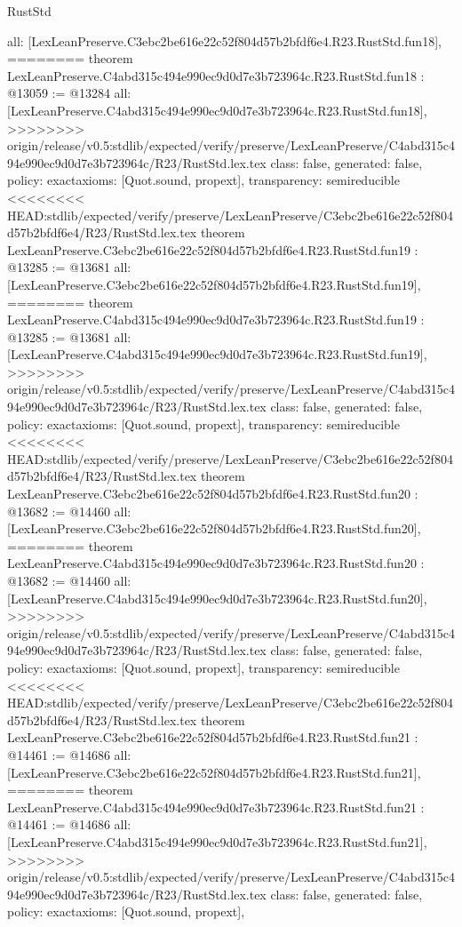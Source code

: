\begin{lexlean}{RustStd}
\begin{coremodule}
{\begin{coremodule}
{{{{{{{{{{{{{{{{{{{{{  all: [LexLeanPreserve.C3ebc2be616e22c52f804d57b2bfdf6e4.R23.RustStd.fun18],
========
theorem LexLeanPreserve.C4abd315c494e990ec9d0d7e3b723964c.R23.RustStd.fun18 : @13059 := @13284 {
  all: [LexLeanPreserve.C4abd315c494e990ec9d0d7e3b723964c.R23.RustStd.fun18],
>>>>>>>> origin/release/v0.5:stdlib/expected/verify/preserve/LexLeanPreserve/C4abd315c494e990ec9d0d7e3b723964c/R23/RustStd.lex.tex
  class: false,
  generated: false,
  policy: exact{axioms: [Quot.sound, propext]},
  transparency: semireducible
}
<<<<<<<< HEAD:stdlib/expected/verify/preserve/LexLeanPreserve/C3ebc2be616e22c52f804d57b2bfdf6e4/R23/RustStd.lex.tex
theorem LexLeanPreserve.C3ebc2be616e22c52f804d57b2bfdf6e4.R23.RustStd.fun19 : @13285 := @13681 {
  all: [LexLeanPreserve.C3ebc2be616e22c52f804d57b2bfdf6e4.R23.RustStd.fun19],
========
theorem LexLeanPreserve.C4abd315c494e990ec9d0d7e3b723964c.R23.RustStd.fun19 : @13285 := @13681 {
  all: [LexLeanPreserve.C4abd315c494e990ec9d0d7e3b723964c.R23.RustStd.fun19],
>>>>>>>> origin/release/v0.5:stdlib/expected/verify/preserve/LexLeanPreserve/C4abd315c494e990ec9d0d7e3b723964c/R23/RustStd.lex.tex
  class: false,
  generated: false,
  policy: exact{axioms: [Quot.sound, propext]},
  transparency: semireducible
}
<<<<<<<< HEAD:stdlib/expected/verify/preserve/LexLeanPreserve/C3ebc2be616e22c52f804d57b2bfdf6e4/R23/RustStd.lex.tex
theorem LexLeanPreserve.C3ebc2be616e22c52f804d57b2bfdf6e4.R23.RustStd.fun20 : @13682 := @14460 {
  all: [LexLeanPreserve.C3ebc2be616e22c52f804d57b2bfdf6e4.R23.RustStd.fun20],
========
theorem LexLeanPreserve.C4abd315c494e990ec9d0d7e3b723964c.R23.RustStd.fun20 : @13682 := @14460 {
  all: [LexLeanPreserve.C4abd315c494e990ec9d0d7e3b723964c.R23.RustStd.fun20],
>>>>>>>> origin/release/v0.5:stdlib/expected/verify/preserve/LexLeanPreserve/C4abd315c494e990ec9d0d7e3b723964c/R23/RustStd.lex.tex
  class: false,
  generated: false,
  policy: exact{axioms: [Quot.sound, propext]},
  transparency: semireducible
}
<<<<<<<< HEAD:stdlib/expected/verify/preserve/LexLeanPreserve/C3ebc2be616e22c52f804d57b2bfdf6e4/R23/RustStd.lex.tex
theorem LexLeanPreserve.C3ebc2be616e22c52f804d57b2bfdf6e4.R23.RustStd.fun21 : @14461 := @14686 {
  all: [LexLeanPreserve.C3ebc2be616e22c52f804d57b2bfdf6e4.R23.RustStd.fun21],
========
theorem LexLeanPreserve.C4abd315c494e990ec9d0d7e3b723964c.R23.RustStd.fun21 : @14461 := @14686 {
  all: [LexLeanPreserve.C4abd315c494e990ec9d0d7e3b723964c.R23.RustStd.fun21],
>>>>>>>> origin/release/v0.5:stdlib/expected/verify/preserve/LexLeanPreserve/C4abd315c494e990ec9d0d7e3b723964c/R23/RustStd.lex.tex
  class: false,
  generated: false,
  policy: exact{axioms: [Quot.sound, propext]},
}}}}}}}}}}}}}}}}}}}}}}}}}
\end{coremodule}}
\end{coremodule}
\end{lexlean}
